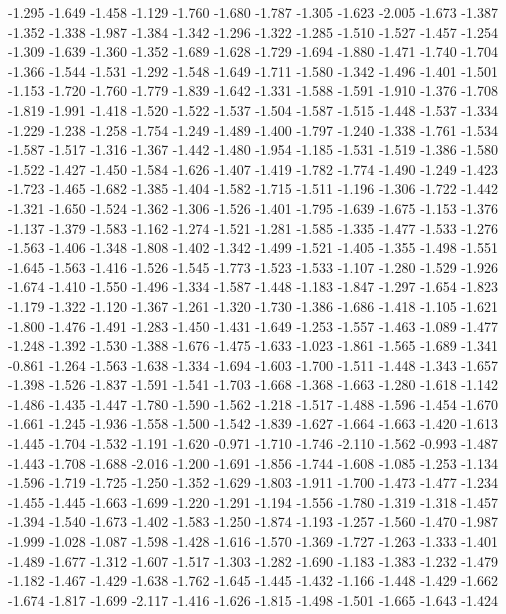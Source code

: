 \documentclass[9pt]{article}
\theoremstyle{plain}
\theoremstyle{definition}
\theoremstyle{remark}
\numberwithin{equation}{section}
\begin{document}
-1.295
-1.649
-1.458
-1.129
-1.760
-1.680
-1.787
-1.305
-1.623
-2.005
-1.673
-1.387
-1.352
-1.338
-1.987
-1.384
-1.342
-1.296
-1.322
-1.285
-1.510
-1.527
-1.457
-1.254
-1.309
-1.639
-1.360
-1.352
-1.689
-1.628
-1.729
-1.694
-1.880
-1.471
-1.740
-1.704
-1.366
-1.544
-1.531
-1.292
-1.548
-1.649
-1.711
-1.580
-1.342
-1.496
-1.401
-1.501
-1.153
-1.720
-1.760
-1.779
-1.839
-1.642
-1.331
-1.588
-1.591
-1.910
-1.376
-1.708
-1.819
-1.991
-1.418
-1.520
-1.522
-1.537
-1.504
-1.587
-1.515
-1.448
-1.537
-1.334
-1.229
-1.238
-1.258
-1.754
-1.249
-1.489
-1.400
-1.797
-1.240
-1.338
-1.761
-1.534
-1.587
-1.517
-1.316
-1.367
-1.442
-1.480
-1.954
-1.185
-1.531
-1.519
-1.386
-1.580
-1.522
-1.427
-1.450
-1.584
-1.626
-1.407
-1.419
-1.782
-1.774
-1.490
-1.249
-1.423
-1.723
-1.465
-1.682
-1.385
-1.404
-1.582
-1.715
-1.511
-1.196
-1.306
-1.722
-1.442
-1.321
-1.650
-1.524
-1.362
-1.306
-1.526
-1.401
-1.795
-1.639
-1.675
-1.153
-1.376
-1.137
-1.379
-1.583
-1.162
-1.274
-1.521
-1.281
-1.585
-1.335
-1.477
-1.533
-1.276
-1.563
-1.406
-1.348
-1.808
-1.402
-1.342
-1.499
-1.521
-1.405
-1.355
-1.498
-1.551
-1.645
-1.563
-1.416
-1.526
-1.545
-1.773
-1.523
-1.533
-1.107
-1.280
-1.529
-1.926
-1.674
-1.410
-1.550
-1.496
-1.334
-1.587
-1.448
-1.183
-1.847
-1.297
-1.654
-1.823
-1.179
-1.322
-1.120
-1.367
-1.261
-1.320
-1.730
-1.386
-1.686
-1.418
-1.105
-1.621
-1.800
-1.476
-1.491
-1.283
-1.450
-1.431
-1.649
-1.253
-1.557
-1.463
-1.089
-1.477
-1.248
-1.392
-1.530
-1.388
-1.676
-1.475
-1.633
-1.023
-1.861
-1.565
-1.689
-1.341
-0.861
-1.264
-1.563
-1.638
-1.334
-1.694
-1.603
-1.700
-1.511
-1.448
-1.343
-1.657
-1.398
-1.526
-1.837
-1.591
-1.541
-1.703
-1.668
-1.368
-1.663
-1.280
-1.618
-1.142
-1.486
-1.435
-1.447
-1.780
-1.590
-1.562
-1.218
-1.517
-1.488
-1.596
-1.454
-1.670
-1.661
-1.245
-1.936
-1.558
-1.500
-1.542
-1.839
-1.627
-1.664
-1.663
-1.420
-1.613
-1.445
-1.704
-1.532
-1.191
-1.620
-0.971
-1.710
-1.746
-2.110
-1.562
-0.993
-1.487
-1.443
-1.708
-1.688
-2.016
-1.200
-1.691
-1.856
-1.744
-1.608
-1.085
-1.253
-1.134
-1.596
-1.719
-1.725
-1.250
-1.352
-1.629
-1.803
-1.911
-1.700
-1.473
-1.477
-1.234
-1.455
-1.445
-1.663
-1.699
-1.220
-1.291
-1.194
-1.556
-1.780
-1.319
-1.318
-1.457
-1.394
-1.540
-1.673
-1.402
-1.583
-1.250
-1.874
-1.193
-1.257
-1.560
-1.470
-1.987
-1.999
-1.028
-1.087
-1.598
-1.428
-1.616
-1.570
-1.369
-1.727
-1.263
-1.333
-1.401
-1.489
-1.677
-1.312
-1.607
-1.517
-1.303
-1.282
-1.690
-1.183
-1.383
-1.232
-1.479
-1.182
-1.467
-1.429
-1.638
-1.762
-1.645
-1.445
-1.432
-1.166
-1.448
-1.429
-1.662
-1.674
-1.817
-1.699
-2.117
-1.416
-1.626
-1.815
-1.498
-1.501
-1.665
-1.643
-1.424
\end{document}
